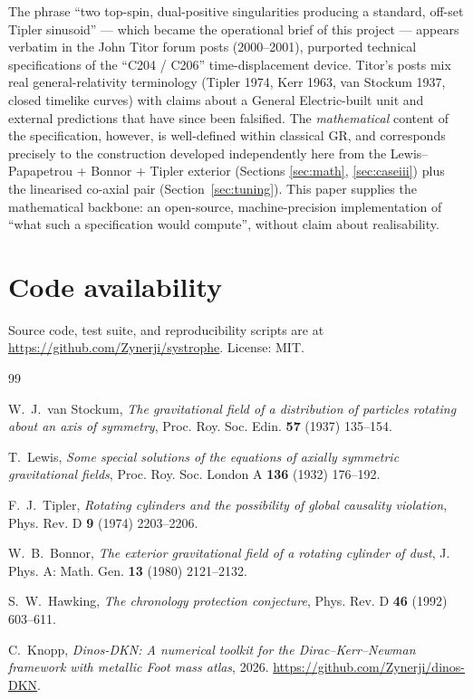 \documentclass[11pt,a4paper]{article}
\begin{document}
The phrase ``two top-spin, dual-positive singularities producing a
standard, off-set Tipler sinusoid'' --- which became the operational
brief of this project --- appears verbatim in the John Titor
forum posts (2000--2001), purported technical specifications of the
``C204 / C206'' time-displacement device. Titor's posts mix real
general-relativity terminology (Tipler 1974, Kerr 1963,
van Stockum 1937, closed timelike curves) with claims about a
General Electric-built unit and external predictions that have since
been falsified. The \emph{mathematical} content of the specification,
however, is well-defined within classical GR, and corresponds
precisely to the construction developed independently here from the
Lewis--Papapetrou + Bonnor + Tipler exterior (Sections \ref{sec:math},
\ref{sec:caseiii}) plus the linearised co-axial pair
(Section~\ref{sec:tuning}). This paper supplies the mathematical
backbone: an open-source, machine-precision implementation of
``what such a specification would compute'', without claim about
realisability.

\section*{Code availability}

Source code, test suite, and reproducibility scripts are at
\url{https://github.com/Zynerji/systrophe}. License: MIT.

\begin{thebibliography}{99}

 W.~J.~van Stockum,
\emph{The gravitational field of a distribution of particles rotating
about an axis of symmetry}, Proc. Roy. Soc. Edin. \textbf{57} (1937)
135--154.

 T.~Lewis,
\emph{Some special solutions of the equations of axially symmetric
gravitational fields}, Proc. Roy. Soc. London A \textbf{136} (1932)
176--192.

 F.~J.~Tipler,
\emph{Rotating cylinders and the possibility of global causality
violation}, Phys. Rev. D \textbf{9} (1974) 2203--2206.

 W.~B.~Bonnor,
\emph{The exterior gravitational field of a rotating cylinder of dust},
J. Phys. A: Math. Gen. \textbf{13} (1980) 2121--2132.

 S.~W.~Hawking,
\emph{The chronology protection conjecture}, Phys. Rev. D \textbf{46}
(1992) 603--611.

 C.~Knopp,
\emph{Dinos-DKN: A numerical toolkit for the Dirac--Kerr--Newman
framework with metallic Foot mass atlas}, 2026.
\url{https://github.com/Zynerji/dinos-DKN}.

\end{thebibliography}
\end{document}
